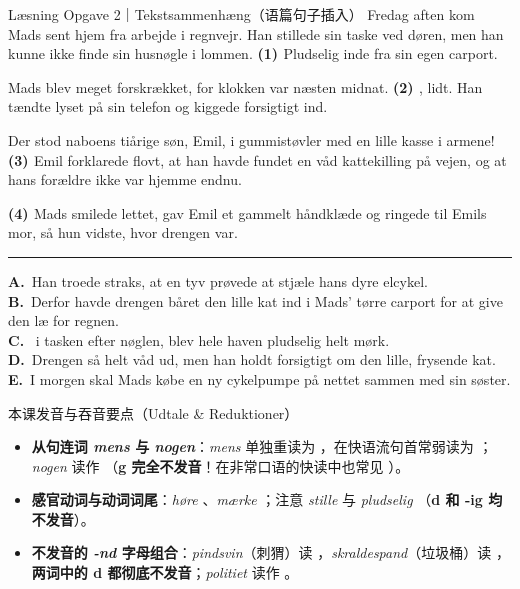 \vspace{0.3em}
\begin{emailbox}{Læsning Opgave 2｜Tekstsammenhæng（语篇句子插入）}
Fredag aften kom Mads sent hjem fra arbejde i regnvejr. Han stillede sin taske ved døren, men han kunne ikke finde sin husnøgle i lommen. \textbf{(1) \underline{\hspace{2.2cm}}} Pludselig  inde fra sin egen carport.

Mads blev meget forskrækket, for klokken var næsten midnat. \textbf{(2) \underline{\hspace{2.2cm}}} ,  lidt. Han tændte lyset på sin telefon og kiggede forsigtigt ind.

Der stod naboens tiårige søn, Emil, i gummistøvler med en lille kasse i armene! \textbf{(3) \underline{\hspace{2.2cm}}} Emil forklarede flovt, at han havde fundet en våd kattekilling på vejen, og at hans forældre ikke var hjemme endnu.

\textbf{(4) \underline{\hspace{2.2cm}}} Mads smilede lettet, gav Emil et gammelt håndklæde og ringede til Emils mor, så hun vidste, hvor drengen var.

\vspace{0.4em}
\hrule
\vspace{0.4em}
\small
\textbf{A.}\ Han troede straks, at en tyv prøvede at stjæle hans dyre elcykel.\\
\textbf{B.}\ Derfor havde drengen båret den lille kat ind i Mads' tørre carport for at give den læ for regnen.\\
\textbf{C.}\  i tasken efter nøglen, blev hele haven pludselig helt mørk.\\
\textbf{D.}\ Drengen så helt våd ud, men han holdt forsigtigt om den lille, frysende kat.\\
\textbf{E.}\ I morgen skal Mads købe en ny cykelpumpe på nettet sammen med sin søster.
\end{emailbox}

\begin{tipbox}{本课发音与吞音要点（Udtale \& Reduktioner）}
\begin{itemize}
  \item \textbf{从句连词 \textit{mens} 与 \textit{nogen}}：\textit{mens} 单独重读为 ，在快语流句首常弱读为 ；\textit{nogen} 读作 （\textbf{g 完全不发音}！在非常口语的快读中也常见 ）。
  \item \textbf{感官动词与动词词尾}：\textit{høre} 、\textit{mærke} ；注意 \textit{stille}  与 \textit{pludselig} （\textbf{d 和 -ig 均不发音}）。
  \item \textbf{不发音的 \textit{-nd} 字母组合}：\textit{pindsvin}（刺猬）读 ，\textit{skraldespand}（垃圾桶）读 ，\textbf{两词中的 d 都彻底不发音}；\textit{politiet} 读作 。
\end{itemize}
\end{tipbox}

